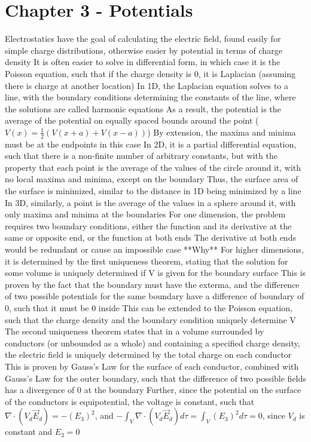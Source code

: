 \documentclass[11 pt, twoside]{article}
\newenvironment{outline*}
{
	\begin{outline}[enumerate]
	}
	{\end{outline}
}
\begin{document}
\section{Chapter 3 - Potentials}
\begin{outline*}
\1 Electrostatics have the goal of calculating the electric field, found easily for simple charge distributions, otherwise easier by potential in terms of charge density
	\2 It is often easier to solve in differential form, in which case it is the Poisson equation, such that if the charge density is 0, it is Laplacian (assuming there is charge at another location)
\1 In 1D, the Laplacian equation solves to a line, with the boundary conditions determining the constants of the line, where the solutions are called harmonic equations
	\2 As a result, the potential is the average of the potential on equally spaced bounds around the point ($V(x) = \frac{1}{2}(V(x + a) + V(x - a))$)
		\3 By extension, the maxima and minima must be at the endpoints in this case
	\2 In 2D, it is a partial differential equation, such that there is a non-finite number of arbitrary constants, but with the property that each point is the average of the values of the circle around it, with no local maxima and minima, except on the boundary
		\3 Thus, the surface area of the surface is minimized, similar to the distance in 1D being minimized by a line
	\2 In 3D, similarly, a point is the average of the values in a sphere around it, with only maxima and minima at the boundaries
	\2 For one dimension, the problem requires two boundary conditions, either the function and its derivative at the same or opposite end, or the function at both ends
		\3 The derivative at both ends would be redundant or cause an impossible case **Why**
		\3 For higher dimensions, it is determined by the first uniqueness theorem, stating that the solution for some volume is uniquely determined if V is given for the boundary surface
			\4 This is proven by the fact that the boundary must have the exterma, and the difference of two possible potentials for the same boundary have a difference of boundary of 0, such that it must be 0 inside
			\4 This can be extended to the Poisson equation, such that the charge density and the boundary condition uniquely determine V
		\3 The second uniqueness theorem states that in a volume surrounded by conductors (or unbounded as a whole) and containing a specified charge density, the electric field is uniquely determined by the total charge on each conductor
			\4 This is proven by Gauss's Law for the surface of each conductor, combined with Gauss's Law for the outer boundary, such that the difference of two possible fields has a divergence of 0 at the boundary
			\4 Further, since the potential on the surface of the conductors is equipotential, the voltage is constant, such that $\nabla \cdot (V_d\vec{E}_d) = -(E_3)^2$, and $-\int_V \nabla \cdot (V_d\vec{E}_d)d\tau = \int_V (E_3)^2d\tau = 0$, since $V_d$ is constant and $E_3 = 0$
		
\end{outline*}
\end{document}
